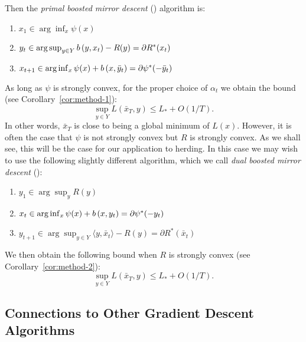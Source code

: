 \documentclass[paper.tex]{subfiles}
\begin{document}
Then 
the {\em primal boosted mirror descent} (\primal) algorithm is:
\begin{enumerate}
\item $x_1 \in \arg\inf_x \psi(x)$
\item $y_{t} \in \arg\sup_{y \in Y} b\left(y, x_t\right) - R(y) = \partial R^{*}(x_{t})$
\item $x_{t+1} \in \arg\inf_{x} \psi(x) + b\left(x, \bar{y}_t\right) = \partial \psi^{*}(-\bar y_{t})$
\end{enumerate}
As long as $\psi$ is strongly convex, for the proper choice of $\alpha_{t}$ we obtain the 
bound (see Corollary~\ref{cor:method-1}):
\begin{equation}
\sup_{y \in Y} L(\bar{x}_T, y) \leq L_{*} + O(1/T).
\end{equation}
In other words, $\bar{x}_T$ is close to being a global minimum of $L(x)$.
However, it is often the case that $\psi$ is not strongly convex but $R$ is strongly convex. As we shall see, this will be the case for our application to herding.
In this case we may wish to use the following slightly different algorithm, which we call {\em dual boosted mirror descent} (\dual):
\begin{enumerate}
\item $y_1 \in \arg\sup_{y} R(y)$
\item $x_t \in \arg\inf_{x} \psi(x) + b\left(x, y_t\right) = \partial \psi^{*}(-y_{t})$
\item $y_{t+1} \in \arg\sup_{y \in Y} \langle y, \bar{x}_t \rangle - R(y) = \partial R^{*}(\bar x_{t})$
\end{enumerate}
We then obtain the following bound 
when $R$ is strongly convex (see Corollary~\ref{cor:method-2}):
\[ \sup_{y \in Y} L(\bar{x}_T, y) \leq L_{*} + O(1/T). \]



\subsection{Connections to Other Gradient Descent Algorithms}
\end{document}
